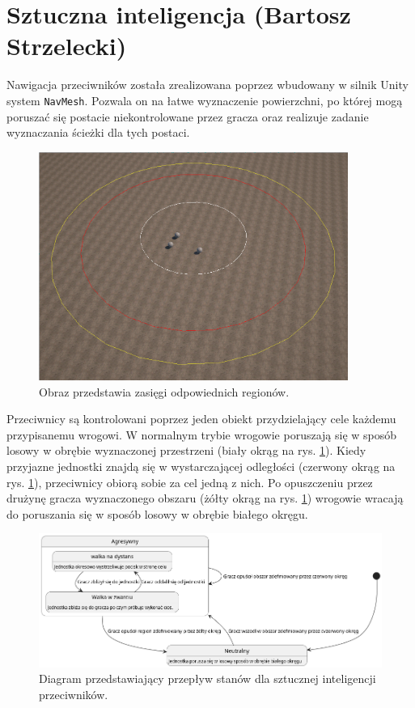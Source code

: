 \section{Sztuczna inteligencja (Bartosz Strzelecki)}\label{s:ai_impl}
Nawigacja przeciwników została zrealizowana poprzez wbudowany w silnik Unity system \texttt{NavMesh}. Pozwala on na łatwe wyznaczenie powierzchni, po której mogą poruszać
się postacie niekontrolowane przez gracza oraz realizuje zadanie wyznaczania ścieżki dla tych postaci.

\begin{figure}[h]
\centering
\includegraphics[width=0.9\textwidth]{images/ai}
\caption{Obraz przedstawia zasięgi odpowiednich regionów.}
\label{fig:regions}
\end{figure}
\FloatBarrier

Przeciwnicy są kontrolowani poprzez jeden obiekt przydzielający cele każdemu przypisanemu wrogowi. W normalnym trybie wrogowie poruszają się w sposób losowy
w obrębie wyznaczonej przestrzeni (biały okrąg na rys. \ref{fig:regions}). Kiedy przyjazne jednostki znajdą się w wystarczającej odległości (czerwony okrąg na rys. \ref{fig:regions}), przeciwnicy obiorą sobie za cel jedną z nich.
Po opuszczeniu przez drużynę gracza wyznaczonego obszaru (żółty okrąg na rys. \ref{fig:regions}) wrogowie wracają do poruszania się w sposób losowy w obrębie białego okręgu.


\begin{figure}[h]
\centering
\includegraphics[width=1\textwidth]{uml/ai}
\caption{Diagram przedstawiający przepływ stanów dla sztucznej inteligencji przeciwników.}
\end{figure}
\FloatBarrier
